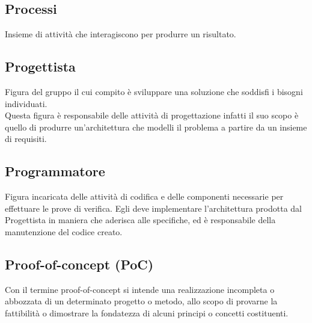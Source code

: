 	\subsection{Processi}  
		Insieme di attività che interagiscono per produrre un risultato.
	\subsection{Progettista} 
		Figura del gruppo il cui compito  è sviluppare una soluzione che soddisfi i bisogni individuati. \\
		Questa figura è responsabile delle attività di progettazione infatti il suo scopo è quello di produrre un’architettura che modelli il problema a partire da un insieme di requisiti.
	\subsection{Programmatore} 
		Figura incaricata delle attività di codifica e delle componenti necessarie per effettuare le prove di verifica. Egli deve implementare l’architettura prodotta dal Progettista in maniera che aderisca alle specifiche, ed è responsabile della manutenzione del codice creato.
	\subsection{Proof-of-concept (PoC) }  
		Con il termine proof-of-concept si intende una realizzazione incompleta o abbozzata di un determinato progetto o metodo, allo scopo di provarne la fattibilità o dimostrare la fondatezza di alcuni principi o concetti costituenti.





\newpage